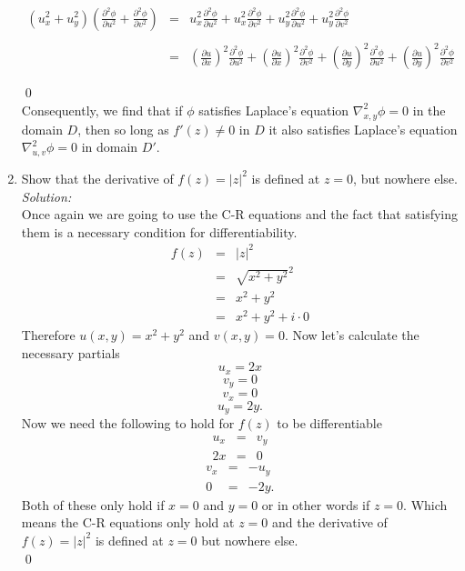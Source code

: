 \documentclass[10pt]{amsart}
\theoremstyle{nonumberplain}
\begin{document}
\begin{enumerate}[label={\bf {\arabic*}:}]
\begin{eqnarray*}
\end{eqnarray*}
\begin{eqnarray*}
\left(u_x^2 + u_y^2\right) \left(\frac{\partial^2\phi}{\partial u^2} + \frac{\partial^2 \phi }{\partial v^2}\right) &=& u_x^2\frac{\partial^2\phi}{\partial u^2}
	+ u_x^2\frac{\partial^2 \phi }{\partial v^2}
	+ u_y^2\frac{\partial^2\phi}{\partial u^2}
	+ u_y^2\frac{\partial^2 \phi }{\partial v^2} \\ \\
&=& \left(\frac{\partial u}{\partial x}\right)^2 \frac{\partial^2\phi}{\partial u^2}
	+ \left(\frac{\partial u}{\partial x}\right)^2 \frac{\partial^2 \phi }{\partial v^2}
	+ \left(\frac{\partial u}{\partial y}\right)^2 \frac{\partial^2\phi}{\partial u^2}
	+ \left(\frac{\partial u}{\partial y}\right)^2 \frac{\partial^2 \phi }{\partial v^2} \\ \\
\end{eqnarray*}
\qed \\
\noindent
Consequently, we find that if $\phi$ satisfies Laplace's equation $\nabla_{x, y}^2 \phi = 0$ in the domain $D$,
then so long as $f'(z) \neq 0$ in $D$ it also satisfies Laplace's equation $\nabla_{u, v}^2 \phi = 0$ in domain $D'$. \\
\item Show that the derivative of $f(z)=|z|^2$ is defined at $z=0$, but nowhere else.\\
\textit{Solution:} \\
Once again we are going to use the C-R equations and the fact that satisfying them is a necessary condition for differentiability.
\begin{eqnarray*}
f(z) &=&|z|^2 \\
      &=&\sqrt{x^2 + y^2}^2 \\
      &=& x^2 + y^2 \\
      &=& x^2 + y^2 + i \cdot 0
\end{eqnarray*}
Therefore $u(x, y) = x^2 + y^2$ and $v(x, y) = 0$. Now let's calculate the necessary partials
$$u_x = 2x$$ $$v_y = 0$$ $$v_x = 0$$ $$u_y = 2y.$$
Now we need the following to hold for $f(z)$ to be differentiable
\begin{eqnarray*}
u_x &=& v_y \\
2x &=& 0
\end{eqnarray*}
\begin{eqnarray*}
v_x &=& - u_y \\
0 &=& - 2y.
\end{eqnarray*}
Both of these only hold if $x=0$ and $y=0$ or in other words if $z=0$.
Which means the C-R equations only hold at $z=0$ and the derivative of $f(z) = |z|^2$ is defined at $z=0$ but nowhere else. \\
\qed


\end{enumerate}
\end{document}
